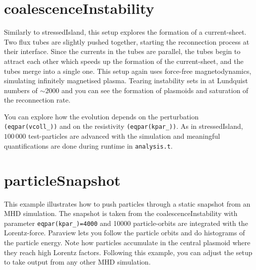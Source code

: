 \documentclass[10pt]{article}
\begin{document}
\section*{coalescenceInstability}

Similarly to stressedIsland, this setup explores the formation of a current-sheet.  Two flux tubes are slightly pushed together, starting the reconnection process at their interface.  Since the currents in the tubes are parallel, the tubes begin to attract each other which speeds up the formation of the current-sheet, and the tubes merge into a single one.  This setup again uses force-free magnetodynamics, simulating infinitely magnetised plasma.  Tearing instability sets in at Lundquist numbers of $\sim2000$ and you can see the formation of plasmoids and saturation of the reconnection rate.  

You can explore how the evolution depends on the perturbation {\tt (eqpar(vcoll\_))} and on the resistivity {\tt (eqpar(kpar\_))}.  
As in stressedIsland, $100\,000$ test-particles are advanced with the simulation and meaningful quantifications are done during runtime in {\tt analysis.t}.  

\section*{particleSnapshot}

This example illustrates how to push particles through a static snapshot from an MHD simulation.  The snapshot is taken from the coalescenceInstability with parameter {\tt eqpar(kpar\_)=4000} and 10000 particle-orbits are integrated with the Lorentz-force.  
Paraview lets you follow the particle orbits and do histograms of the particle energy.  Note how particles accumulate in the central plasmoid where they reach high Lorentz factors.  
Following this example, you can adjust the setup to take output from any other MHD simulation.  
\end{document}
